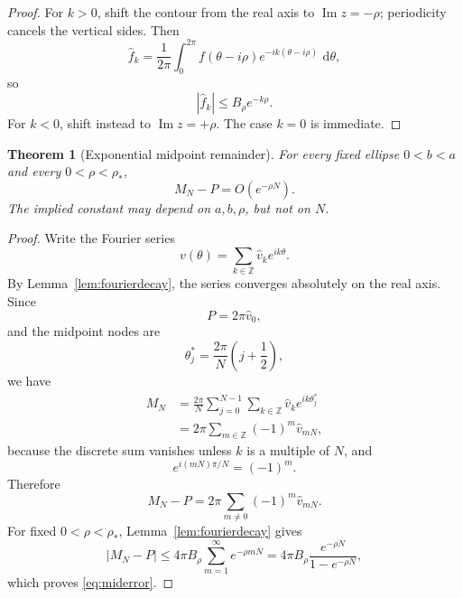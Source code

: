 \documentclass[11pt]{article}
\newtheorem{theorem}{Theorem}[section]
\theoremstyle{definition}
\newcommand{\dd}{\,\mathrm{d}}
\numberwithin{equation}{section}
\begin{document}
\begin{proof}
For \(k>0\), shift the contour from the real axis to
\(\operatorname{Im}z=-\rho\); periodicity cancels the vertical sides.
Then
\[
\widehat f_k
=
\frac1{2\pi}
\int_0^{2\pi}
f(\theta-i\rho)e^{-ik(\theta-i\rho)}\,\dd\theta,
\]
so
\[
|\widehat f_k|\le B_\rho e^{-k\rho}.
\]
For \(k<0\), shift instead to \(\operatorname{Im}z=+\rho\).
The case \(k=0\) is immediate.
\end{proof}

\begin{theorem}[Exponential midpoint remainder]
\label{thm:midpoint}
For every fixed ellipse \(0<b<a\) and every
\(0<\rho<\rho_*\),
\begin{equation}
\label{eq:miderror}
\boxed{
M_N-P=O(e^{-\rho N}).
}
\end{equation}
The implied constant may depend on \(a,b,\rho\), but not on \(N\).
\end{theorem}

\begin{proof}
Write the Fourier series
\[
v(\theta)=\sum_{k\in\mathbb Z}\widehat v_k e^{ik\theta}.
\]
By Lemma~\ref{lem:fourierdecay}, the series converges absolutely on the
real axis.  Since
\[
P=2\pi\widehat v_0,
\]
and the midpoint nodes are
\[
\theta_j^*=\frac{2\pi}{N}\left(j+\frac12\right),
\]
we have
\begin{align*}
M_N
&=
\frac{2\pi}{N}
\sum_{j=0}^{N-1}
\sum_{k\in\mathbb Z}
\widehat v_k e^{ik\theta_j^*} \\
&=
2\pi
\sum_{m\in\mathbb Z}
(-1)^m\widehat v_{mN},
\end{align*}
because the discrete sum vanishes unless \(k\) is a multiple of \(N\),
and
\[
e^{i(mN)\pi/N}=(-1)^m.
\]
Therefore
\[
M_N-P
=
2\pi
\sum_{m\ne0}
(-1)^m\widehat v_{mN}.
\]
For fixed \(0<\rho<\rho_*\), Lemma~\ref{lem:fourierdecay} gives
\[
|M_N-P|
\le
4\pi B_\rho
\sum_{m=1}^{\infty}e^{-\rho mN}
=
4\pi B_\rho
\frac{e^{-\rho N}}{1-e^{-\rho N}},
\]
which proves \eqref{eq:miderror}.
\end{proof}
\end{document}
